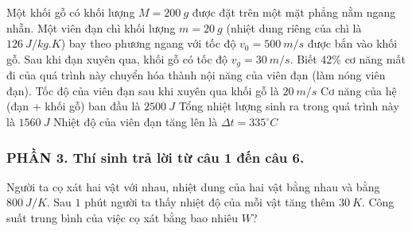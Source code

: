 \begin{ex}
	Một khối gỗ có khối lượng $M = 200\ g$ được đặt trên một mặt phẳng nằm ngang nhẵn. Một viên đạn chì khối lượng $m = 20\ g$ (nhiệt dung riêng của chì là $126\ J/kg.K$) bay theo phương ngang với tốc độ $v_0 = 500\ m/s$ được bắn vào khối gỗ. Sau khi đạn xuyên qua, khối gỗ có tốc độ $v_g = 30\ m/s$. Biết 42\% cơ năng mất đi của quá trình này chuyển hóa thành nội năng của viên đạn (làm nóng viên đạn).
	\choiceTFt
	{Tốc độ của viên đạn sau khi xuyên qua khối gỗ là $20\ m/s$}
	{\True Cơ năng của hệ (đạn + khối gỗ) ban đầu là $2500\ J$}
	{Tổng nhiệt lượng sinh ra trong quá trình này là $1560\ J$}
	{\True Nhiệt độ của viên đạn tăng lên là $\Delta t = 335^\circ C$}
\end{ex}
\subsubsection*{PHẦN 3. Thí sinh trả lời từ câu 1 đến câu 6.}
\setcounter{ex}{0}
\begin{ex}%
	Người ta cọ xát hai vật với nhau, nhiệt dung của hai vật bằng nhau và bằng $800\ J/K$. Sau $1$ phút người ta thấy nhiệt độ của mỗi vật tăng thêm $30\ K$. Công suất trung bình của việc cọ xát bằng bao nhiêu $W$?
\end{ex}

